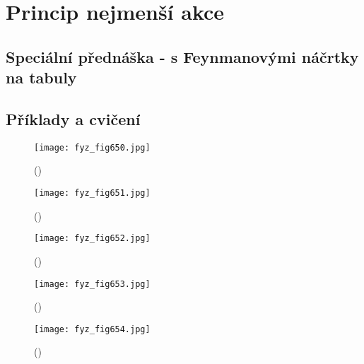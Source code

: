 \chapter{Princip nejmenší akce}\label{fyz:IIchaXIX}
\minitoc
  \section{Speciální přednáška - s Feynmanovými náčrtky na tabuly}\label{fyz:IIchaXIXsecI}
  \section{Příklady a cvičení}\label{fyz:IIchaXIXsecII}

    \begin{figure}[ht!] %
      \centering
      \texttt{[image: fyz\_fig650.jpg]}
      \caption{
               (\cite[s.~707]{Feynman02})}
      \label{fyz_fig650}
    \end{figure}

    \begin{figure}[ht!] %
      \centering
      \texttt{[image: fyz\_fig651.jpg]}
      \caption{
               (\cite[s.~707]{Feynman02})}
      \label{fyz_fig651}
    \end{figure}

    \begin{figure}[ht!] %
      \centering
      \texttt{[image: fyz\_fig652.jpg]}
      \caption{
               (\cite[s.~707]{Feynman02})}
      \label{fyz_fig652}
    \end{figure}

    \begin{figure}[ht!] %
      \centering
      \texttt{[image: fyz\_fig653.jpg]}
      \caption{
               (\cite[s.~707]{Feynman02})}
      \label{fyz_fig653}
    \end{figure}

    \begin{figure}[ht!] %
      \centering
      \texttt{[image: fyz\_fig654.jpg]}
      \caption{
               (\cite[s.~707]{Feynman02})}
      \label{fyz_fig654}
    \end{figure}


